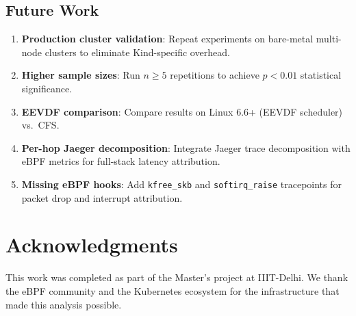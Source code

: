 \documentclass[11pt,a4paper]{article}
\begin{document}
\subsection{Future Work}

\begin{enumerate}[leftmargin=*]
  \item \textbf{Production cluster validation}: Repeat experiments on bare-metal multi-node clusters to eliminate Kind-specific overhead.
  \item \textbf{Higher sample sizes}: Run $n \geq 5$ repetitions to achieve $p<0.01$ statistical significance.
  \item \textbf{EEVDF comparison}: Compare results on Linux 6.6+ (EEVDF scheduler) vs.\ CFS.
  \item \textbf{Per-hop Jaeger decomposition}: Integrate Jaeger trace decomposition with eBPF metrics for full-stack latency attribution.
  \item \textbf{Missing eBPF hooks}: Add \texttt{kfree\_skb} and \texttt{softirq\_raise} tracepoints for packet drop and interrupt attribution.
\end{enumerate}


\section*{Acknowledgments}

This work was completed as part of the Master's project at IIIT-Delhi. We thank the eBPF community and the Kubernetes ecosystem for the infrastructure that made this analysis possible.



\end{document}

